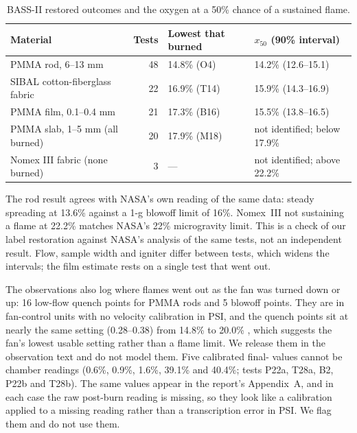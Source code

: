 \documentclass[10pt,letterpaper]{article}
\newcommand{\Otwo}{\ce{O2}}
\begin{document}
\begin{table}[h]
\centering\small
\caption{BASS-II restored outcomes and the oxygen at a 50\% chance of a sustained flame.}\label{tab:bass2}
\begin{tabular}{@{}lrll@{}}
\toprule
Material & Tests & Lowest \Otwo{} that burned & $x_{50}$ (90\% interval) \\
\midrule
PMMA rod, 6--13 mm & 48 & 14.8\% (O4) & 14.2\% (12.6--15.1) \\
SIBAL cotton-fiberglass fabric & 22 & 16.9\% (T14) & 15.9\% (14.3--16.9) \\
PMMA film, 0.1--0.4 mm & 21 & 17.3\% (B16) & 15.5\% (13.8--16.5) \\
PMMA slab, 1--5 mm (all burned) & 20 & 17.9\% (M18) & not identified; below 17.9\% \\
Nomex III fabric (none burned) & 3 & --- & not identified; above 22.2\% \\
\bottomrule
\end{tabular}
\end{table}

The rod result agrees with NASA's own reading of the same data: steady spreading at 13.6\% \Otwo{} against a 1-g blowoff limit of 16\%. Nomex~III not sustaining a flame at 22.2\% matches NASA's 22\% microgravity limit. This is a check of our label restoration against NASA's analysis of the same tests, not an independent result. Flow, sample width and igniter differ between tests, which widens the intervals; the film estimate rests on a single test that went out.

The observations also log where flames went out as the fan was turned down or up: 16 low-flow quench points for PMMA rods and 5 blowoff points. They are in fan-control units with no velocity calibration in PSI, and the quench points sit at nearly the same setting (0.28--0.38) from 14.8\% to 20.0\% \Otwo, which suggests the fan's lowest usable setting rather than a flame limit. We release them in the observation text and do not model them. Five calibrated final-\Otwo{} values cannot be chamber readings (0.6\%, 0.9\%, 1.6\%, 39.1\% and 40.4\%; tests P22a, T28a, B2, P22b and T28b). The same values appear in the report's Appendix~A, and in each case the raw post-burn reading is missing, so they look like a calibration applied to a missing reading rather than a transcription error in PSI. We flag them and do not use them.
\end{document}
